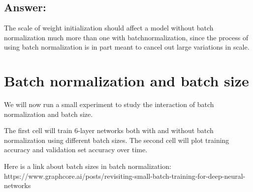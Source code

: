\documentclass[11pt]{article}
\begin{document}
    \hypertarget{answer}{%
\subsection{Answer:}\label{answer}}

The scale of weight initialization should affect a model without batch
normalization much more than one with batchnormalization, since the
process of using batch normalization is in part meant to cancel out
large variations in scale.

    \hypertarget{batch-normalization-and-batch-size}{%
\section{Batch normalization and batch
size}\label{batch-normalization-and-batch-size}}

We will now run a small experiment to study the interaction of batch
normalization and batch size.

The first cell will train 6-layer networks both with and without batch
normalization using different batch sizes. The second cell will plot
training accuracy and validation set accuracy over time.

Here is a link about batch sizes in batch normalization:
https://www.graphcore.ai/posts/revisiting-small-batch-training-for-deep-neural-networks
\end{document}
